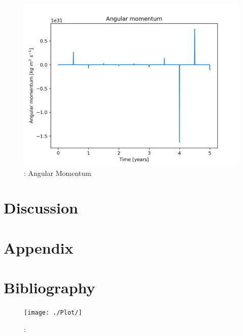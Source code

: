 \documentclass{article}
\begin{document}
\begin{figure}[H]
    \begin{center}
        \includegraphics[width=\textwidth]{./Plot/angular_momentum.png}
        \caption{: Angular Momentum}
        \label{fig:am}
    \end{center}
\end{figure}

\section{Discussion}

\section{Appendix}

\section{Bibliography}

\begin{figure}[H]
    \begin{center}
        \texttt{[image: ./Plot/]}
        \caption{: }
        \label{}
    \end{center}
\end{figure}
\end{document}
